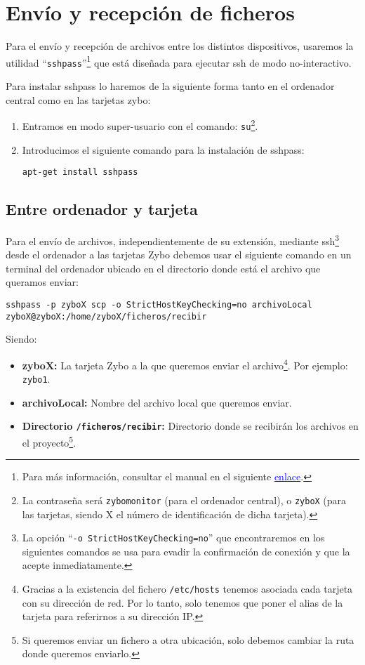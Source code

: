 \section{Envío y recepción de ficheros}
Para el envío y recepción de archivos entre los distintos dispositivos, usaremos la utilidad ``\texttt{sshpass}''\footnote{Para  más información, consultar el manual en el siguiente \href{https://linux.die.net/man/1/sshpass}{\textcolor{blue}{enlace}}.} que está diseñada para ejecutar ssh de modo no-interactivo.

Para instalar sshpass lo haremos de la siguiente forma tanto en el ordenador central como en las tarjetas zybo:
\begin{enumerate}
	\item Entramos en modo super-usuario con el comando: \texttt{su}\footnote{La contraseña será \texttt{zybomonitor} (para el ordenador central), o \texttt{zyboX} (para las tarjetas, siendo X el número de identificación de dicha tarjeta).}.
	\item Introducimos el siguiente comando para la instalación de sshpass:
	\begin{center}
		\texttt{apt-get install sshpass}
	\end{center}
\end{enumerate}
	
\subsection{Entre ordenador y tarjeta}
Para el envío de archivos, independientemente de su extensión, mediante ssh\footnote{La opción ``\texttt{-o StrictHostKeyChecking=no}'' que encontraremos en los siguientes comandos se usa para evadir la confirmación de conexión y que la acepte inmediatamente.} desde el ordenador a las tarjetas Zybo debemos usar el siguiente comando en un terminal del ordenador ubicado en el directorio donde está el archivo que queramos enviar:
\begin{center}
	\texttt{sshpass -p zyboX scp -o StrictHostKeyChecking=no archivoLocal zyboX@zyboX:/home/zyboX/ficheros/recibir}
\end{center}
Siendo:
\begin{itemize}
	\item \textbf{zyboX:} La tarjeta Zybo a la que queremos enviar el archivo\footnote{Gracias a la existencia del fichero \texttt{/etc/hosts} tenemos asociada cada tarjeta con su dirección de red. Por lo tanto, solo tenemos que poner el alias de la tarjeta para referirnos a su dirección IP.}. Por ejemplo: \texttt{zybo1}.
	\item \textbf{archivoLocal:} Nombre del archivo local que queremos enviar.
	\item \textbf{Directorio \texttt{/ficheros/recibir}:} Directorio donde se recibirán los archivos en el proyecto\footnote{Si queremos enviar un fichero a otra ubicación, solo debemos cambiar la ruta donde queremos enviarlo.}.
\end{itemize}

